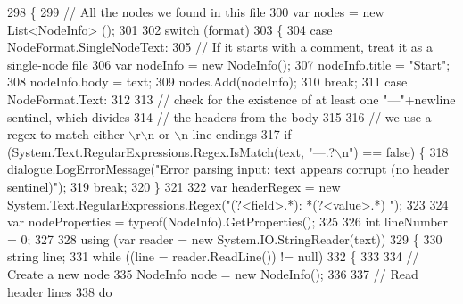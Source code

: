 \begin{DoxyCode}
298         \{
299             \textcolor{comment}{// All the nodes we found in this file}
300             var nodes = \textcolor{keyword}{new} List<NodeInfo> ();
301 
302             \textcolor{keywordflow}{switch} (format)
303             \{
304                 \textcolor{keywordflow}{case} NodeFormat.SingleNodeText:
305                     \textcolor{comment}{// If it starts with a comment, treat it as a single-node file}
306                     var nodeInfo = \textcolor{keyword}{new} NodeInfo();
307                     nodeInfo.title = \textcolor{stringliteral}{"Start"};
308                     nodeInfo.body = text;
309                     nodes.Add(nodeInfo);
310                     \textcolor{keywordflow}{break};                
311                 \textcolor{keywordflow}{case} NodeFormat.Text:
312 
313                     \textcolor{comment}{// check for the existence of at least one "---"+newline sentinel, which divides}
314                     \textcolor{comment}{// the headers from the body}
315 
316                     \textcolor{comment}{// we use a regex to match either \(\backslash\)r\(\backslash\)n or \(\backslash\)n line endings}
317                     \textcolor{keywordflow}{if} (System.Text.RegularExpressions.Regex.IsMatch(text, \textcolor{stringliteral}{"---.?\(\backslash\)n"}) == \textcolor{keyword}{false}) \{
318                         dialogue.LogErrorMessage(\textcolor{stringliteral}{"Error parsing input: text appears corrupt (no header
       sentinel)"});
319                         \textcolor{keywordflow}{break};
320                     \}
321 
322                     var headerRegex = \textcolor{keyword}{new} System.Text.RegularExpressions.Regex(\textcolor{stringliteral}{"(?<field>.*): *(?<value>.*)
      "});
323 
324                     var nodeProperties = typeof(NodeInfo).GetProperties();
325 
326                     \textcolor{keywordtype}{int} lineNumber = 0;
327 
328                     \textcolor{keyword}{using} (var reader = \textcolor{keyword}{new} System.IO.StringReader(text))
329                     \{
330                         \textcolor{keywordtype}{string} line;
331                         \textcolor{keywordflow}{while} ((line = reader.ReadLine()) != null)
332                         \{
333 
334                             \textcolor{comment}{// Create a new node}
335                             NodeInfo node = \textcolor{keyword}{new} NodeInfo();
336 
337                             \textcolor{comment}{// Read header lines}
338                             \textcolor{keywordflow}{do}

\end{DoxyCode}
